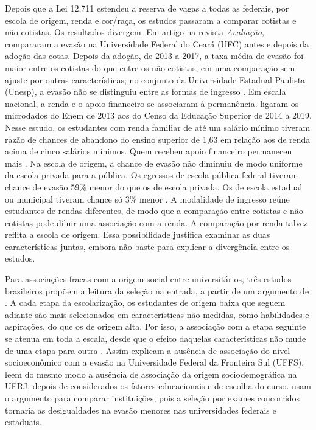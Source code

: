 \documentclass[12pt,a4paper]{article}
\begin{document}
Depois que a Lei 12.711 estendeu a reserva de vagas a todas as federais, por escola de origem, renda e cor/raça, os estudos passaram a comparar cotistas e não cotistas. Os resultados divergem. Em artigo na revista \textit{Avaliação}, \citet{andriolaImpactosLeiCotas2023} compararam a evasão na Universidade Federal do Ceará (UFC) antes e depois da adoção das cotas. Depois da adoção, de 2013 a 2017, a taxa média de evasão foi maior entre os cotistas do que entre os não cotistas, em uma comparação sem ajuste por outras características; no conjunto da Universidade Estadual Paulista (Unesp), a evasão não se distinguiu entre as formas de ingresso \citep{massini-cagliariImpactoPoliticaReserva2021}. Em escala nacional, a renda e o apoio financeiro se associaram à permanência. \citet{paulaDESIGUALDADESAPOSACESSO2024} ligaram os microdados do Enem de 2013 aos do Censo da Educação Superior de 2014 a 2019. Nesse estudo, os estudantes com renda familiar de até um salário mínimo tiveram razão de chances de abandono do ensino superior de 1,63 em relação aos de renda acima de cinco salários mínimos. Quem recebeu apoio financeiro permaneceu mais \citep{saccaroFatoresAssociadosEvasao2019,gomesDeterminantesEvasaoNo2024}. Na escola de origem, a chance de evasão não diminuiu de modo uniforme da escola privada para a pública. Os egressos de escola pública federal tiveram chance de evasão 59\% menor do que os de escola privada. Os de escola estadual ou municipal tiveram chance só 3\% menor \citep{paulaDESIGUALDADESAPOSACESSO2024}. A modalidade de ingresso reúne estudantes de rendas diferentes, de modo que a comparação entre cotistas e não cotistas pode diluir uma associação com a renda. A comparação por renda talvez reflita a escola de origem. Essa possibilidade justifica examinar as duas características juntas, embora não baste para explicar a divergência entre os estudos.

Para associações fracas com a origem social entre universitários, três estudos brasileiros propõem a leitura da seleção na entrada, a partir de um argumento de \citet{mare1980social}. A cada etapa da escolarização, os estudantes de origem baixa que seguem adiante são mais selecionados em características não medidas, como habilidades e aspirações, do que os de origem alta. Por isso, a associação com a etapa seguinte se atenua em toda a escala, desde que o efeito daquelas características não mude de uma etapa para outra \citep[pp.~298--299]{mare1980social}. Assim \citet{nierotkaFatoresAssociadosEvasao2023} explicam a ausência de associação do nível socioeconômico com a evasão na Universidade Federal da Fronteira Sul (UFFS). \citet{klitzkeFATORESASSOCIADOSEVASAO2023} leem do mesmo modo a ausência de associação da origem sociodemográfica na UFRJ, depois de considerados os fatores educacionais e de escolha do curso. \citet[p.~14]{paulaDESIGUALDADESAPOSACESSO2024} usam o argumento para comparar instituições, pois a seleção por exames concorridos tornaria as desigualdades na evasão menores nas universidades federais e estaduais.
\end{document}
